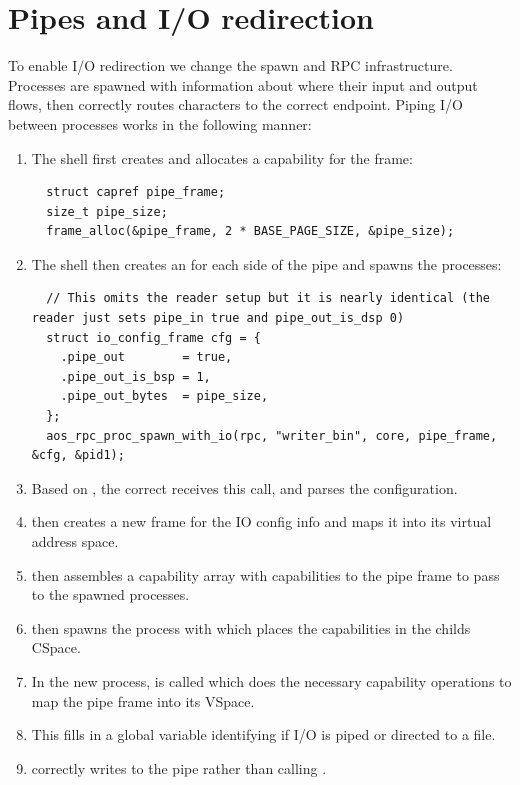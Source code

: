 \section{Pipes and I/O redirection}
To enable I/O redirection we change the spawn and RPC infrastructure. Processes are spawned
with information about where their input and output flows, then  correctly
routes characters to the correct endpoint. Piping I/O between processes works 
in the following manner:
\begin{enumerate}
  \label{pipe_steps}
  \item The shell first creates and allocates a capability for the frame:
  \begin{lstlisting}
  struct capref pipe_frame;
  size_t pipe_size;
  frame_alloc(&pipe_frame, 2 * BASE_PAGE_SIZE, &pipe_size);
  \end{lstlisting}
  \item The shell then creates an  for each side of the pipe and
  spawns the processes:
  \begin{lstlisting}
  // This omits the reader setup but it is nearly identical (the reader just sets pipe_in true and pipe_out_is_dsp 0)
  struct io_config_frame cfg = {
    .pipe_out        = true,
    .pipe_out_is_bsp = 1,
    .pipe_out_bytes  = pipe_size,
  };
  aos_rpc_proc_spawn_with_io(rpc, "writer_bin", core, pipe_frame, &cfg, &pid1);

  \end{lstlisting}
  \item Based on , the correct  receives this  call, and parses the configuration.
  \item {} then creates a new frame for the IO config info and maps it into its virtual address space.
  \item {} then assembles a capability array with capabilities to the pipe frame to pass to the spawned processes.
  \item {} then spawns the process with  which places the capabilities in the childs CSpace.
  \item In the new process,  is called which does the necessary capability operations to map the pipe frame into its VSpace.
  \item This fills in a global variable identifying if I/O is piped or directed to a file.
  \item {} correctly writes to the pipe rather than calling \newline {}.
\end{enumerate}
